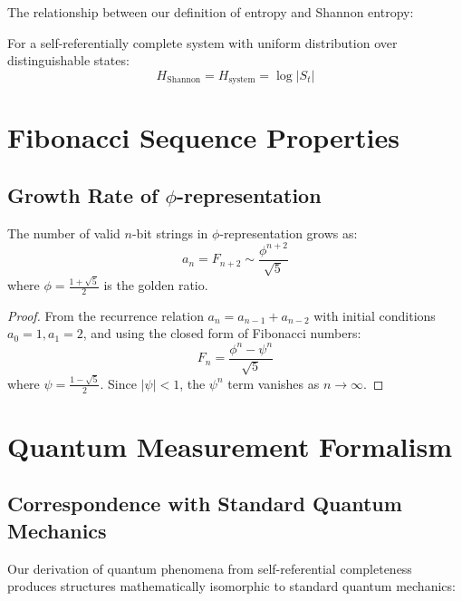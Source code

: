 The relationship between our definition of entropy and Shannon entropy:

\begin{theorem}
For a self-referentially complete system with uniform distribution over distinguishable states:
\begin{equation}
H_{\text{Shannon}} = H_{\text{system}} = \log |S_t|
\end{equation}
\end{theorem}

\section{Fibonacci Sequence Properties}

\subsection{Growth Rate of $\phi$-representation}

\begin{theorem}
The number of valid $n$-bit strings in $\phi$-representation grows as:
\begin{equation}
a_n = F_{n+2} \sim \frac{\phi^{n+2}}{\sqrt{5}}
\end{equation}
where $\phi = \frac{1+\sqrt{5}}{2}$ is the golden ratio.
\end{theorem}

\begin{proof}
From the recurrence relation $a_n = a_{n-1} + a_{n-2}$ with initial conditions $a_0 = 1, a_1 = 2$, and using the closed form of Fibonacci numbers:
\begin{equation}
F_n = \frac{\phi^n - \psi^n}{\sqrt{5}}
\end{equation}
where $\psi = \frac{1-\sqrt{5}}{2}$. Since $|\psi| < 1$, the $\psi^n$ term vanishes as $n \to \infty$.
\end{proof}

\section{Quantum Measurement Formalism}

\subsection{Correspondence with Standard Quantum Mechanics}

Our derivation of quantum phenomena from self-referential completeness produces structures mathematically isomorphic to standard quantum mechanics:

